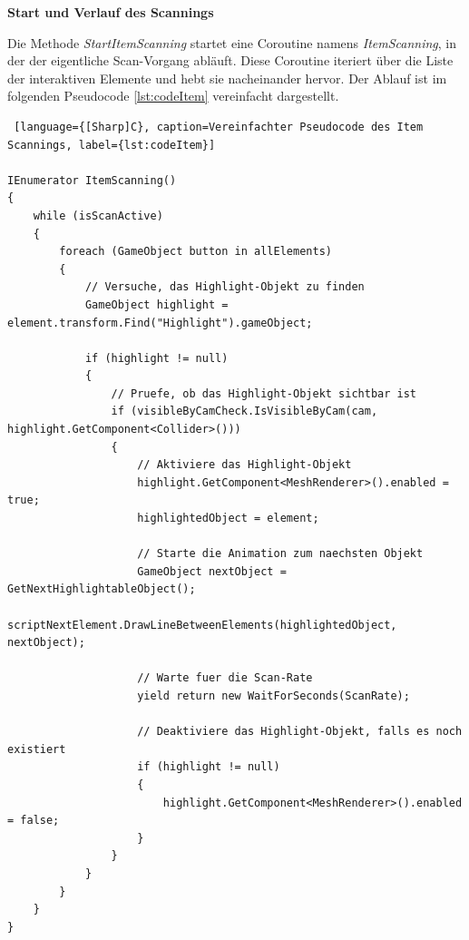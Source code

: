 \textbf{Start und Verlauf des Scannings}

Die Methode \textit{StartItemScanning} startet eine Coroutine namens \textit{ItemScanning}, in der der eigentliche Scan-Vorgang abläuft. Diese Coroutine iteriert über die Liste der interaktiven Elemente und hebt sie nacheinander hervor. Der Ablauf ist im folgenden Pseudocode \autoref{lst:codeItem} vereinfacht dargestellt.

\begin{lstlisting} [language={[Sharp]C}, caption=Vereinfachter Pseudocode des Item Scannings, label={lst:codeItem}]

IEnumerator ItemScanning()
{
    while (isScanActive)
    {
        foreach (GameObject button in allElements)
        {
            // Versuche, das Highlight-Objekt zu finden
            GameObject highlight = element.transform.Find("Highlight").gameObject;
            
            if (highlight != null)
            {
                // Pruefe, ob das Highlight-Objekt sichtbar ist
                if (visibleByCamCheck.IsVisibleByCam(cam, highlight.GetComponent<Collider>()))
                {
                    // Aktiviere das Highlight-Objekt
                    highlight.GetComponent<MeshRenderer>().enabled = true;
                    highlightedObject = element;

                    // Starte die Animation zum naechsten Objekt
                    GameObject nextObject = GetNextHighlightableObject();
                    scriptNextElement.DrawLineBetweenElements(highlightedObject, nextObject);

                    // Warte fuer die Scan-Rate
                    yield return new WaitForSeconds(ScanRate);

                    // Deaktiviere das Highlight-Objekt, falls es noch existiert
                    if (highlight != null)
                    {
                        highlight.GetComponent<MeshRenderer>().enabled = false;
                    }
                }
            }
        }
    }
}

\end{lstlisting}

